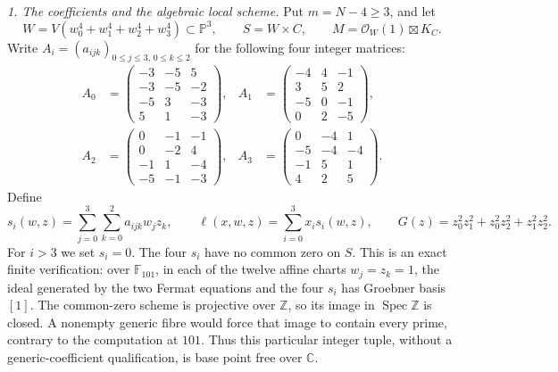 \emph{1. The coefficients and the algebraic local scheme.}
Put $m=N-4\ge3$, and let
\[
 W=V(w_0^4+w_1^4+w_2^4+w_3^4)\subset\mathbb P^3,
 \qquad S=W\times C,
 \qquad M=\mathcal O_W(1)\boxtimes K_C.
\]
Write $A_i=(a_{ijk})_{0\le j\le3,\,0\le k\le2}$ for
the following four integer matrices:
\[
\begin{aligned}
 A_0&=\begin{pmatrix}-3&-5&5\\-3&-5&-2\\-5&3&-3\\5&1&-3\end{pmatrix},&
 A_1&=\begin{pmatrix}-4&4&-1\\3&5&2\\-5&0&-1\\0&2&-5\end{pmatrix},\\[2mm]
 A_2&=\begin{pmatrix}0&-1&-1\\0&-2&4\\-1&1&-4\\-5&-1&-3\end{pmatrix},&
 A_3&=\begin{pmatrix}0&-4&1\\-5&-4&-4\\-1&5&1\\4&2&5\end{pmatrix}.
\end{aligned}
\]
Define
\[
 s_i(w,z)=\sum_{j=0}^3\sum_{k=0}^2a_{ijk}w_jz_k,
 \qquad
 \ell(x,w,z)=\sum_{i=0}^3x_i s_i(w,z),
 \qquad
 G(z)=z_0^2z_1^2+z_0^2z_2^2+z_1^2z_2^2.
\]
For $i>3$ we set $s_i=0$. The four $s_i$ have no
common zero on $S$. This is an exact finite verification:
over $\mathbb F_{101}$, in each of the twelve affine charts
$w_j=z_k=1$, the ideal generated by the two Fermat equations
and the four $s_i$ has Groebner basis $[1]$. The common-zero
scheme is projective over $\mathbb Z$, so its image in
$\operatorname{Spec}\mathbb Z$ is closed. A nonempty generic
fibre would force that image to contain every prime, contrary
to the computation at $101$. Thus this particular integer
tuple, without a generic-coefficient qualification, is
base point free over $\mathbb C$.

